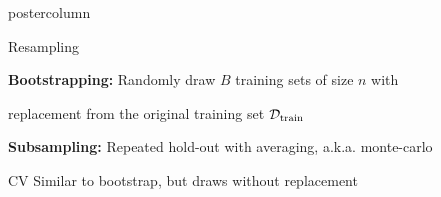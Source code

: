 \documentclass{beamer}
\begin{document}
\begin{frame}[fragile]{}
\begin{columns}
\begin{column}{.31\textwidth}
\begin{beamercolorbox}[center]{postercolumn}
\begin{minipage}{.98\textwidth}
{\begin{myblock}{Resampling}
						\hspace*{1ex}
						\begin{codebox}
							 \textbf{Bootstrapping: }Randomly draw $B$ training sets of size $n$ with
						\end{codebox}
						\begin{codebox}
							   replacement from the original training set $\mathcal{D}_{\text{train}}$
						\end{codebox}
						\hspace*{1ex}
						\begin{codebox}
							 \textbf{Subsampling: }Repeated hold-out with averaging, a.k.a. monte-carlo 
						\end{codebox}
						\begin{codebox}
							  CV Similar to bootstrap, but draws without replacement
						\end{codebox}
						\hspace*{1ex}
                    \end{myblock}
				}
			\end{minipage}
		\end{beamercolorbox}
	\end{column}
\end{columns}
\end{frame}
\end{document}
